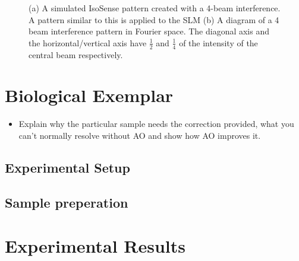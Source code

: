 \begin{figure}[h]
\begin{subfigure}{0.4\textwidth}
			\caption{}
			\label{fig:isosense_visualisation_ft}
		\end{subfigure}
		\caption{(a) A simulated IsoSense pattern created with a 4-beam interference. A pattern similar to this is applied to the SLM (b) A diagram of a 4 beam interference pattern in Fourier space. The diagonal axis and the horizontal/vertical axis have $\frac{1}{2}$ and $\frac{1}{4}$ of the intensity of the central beam respectively.}
		\label{fig:isosense_visualisation}
	\end{figure}

\section{Biological Exemplar}
\label{sec:SIM_biology}

\begin{itemize}
	\item Explain why the particular sample needs the correction provided, what you can't normally resolve without AO and show how  AO improves it.
\end{itemize}

	\subsection{Experimental Setup}
	\label{subsec:SIM_setup}

	\subsection{Sample preperation}
	\label{subsec:SIM_sample_prep}
	
\section{Experimental Results}
\label{sec:SIM_results}